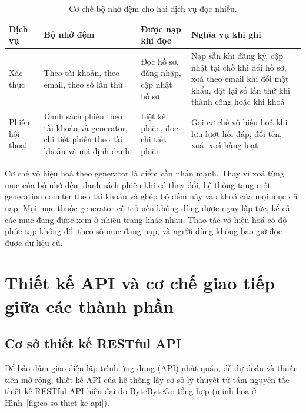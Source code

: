 \begin{table}[htbp]
    \centering
    \caption{Cơ chế bộ nhớ đệm cho hai dịch vụ đọc nhiều.}
    \label{tab:co-che-bo-nho-dem}
    \small
    \begin{tabularx}{\textwidth}{@{}>{\raggedright\arraybackslash}p{2.2cm}>{\raggedright\arraybackslash}p{3.6cm}>{\raggedright\arraybackslash}p{3.6cm}>{\raggedright\arraybackslash}X@{}}
        \toprule
        \textbf{Dịch vụ} & \textbf{Bộ nhớ đệm} & \textbf{Được nạp khi đọc} & \textbf{Nghĩa vụ khi ghi} \\
        \midrule
        Xác thực & Theo tài khoản, theo email, theo số lần thử & Đọc hồ sơ, đăng nhập, cập nhật hồ sơ & Nạp sẵn khi đăng ký, cập nhật tại chỗ khi đổi hồ sơ, xoá theo email khi đổi mật khẩu, đặt lại số lần thử khi thành công hoặc khi khoá \\
        Phiên hội thoại & Danh sách phiên theo tài khoản và generator, chi tiết phiên theo tài khoản và mã định danh & Liệt kê phiên, đọc chi tiết phiên & Gọi cơ chế vô hiệu hoá khi lưu lượt hỏi đáp, đổi tên, xoá, xoá hàng loạt \\
        \bottomrule
    \end{tabularx}
\end{table}

Cơ chế vô hiệu hoá theo generator là điểm cần nhấn mạnh. Thay vì xoá từng mục của bộ nhớ đệm danh sách phiên khi có thay đổi, hệ thống tăng một generation counter theo tài khoản và ghép bộ đếm này vào khoá của mọi mục đã nạp. Mọi mục thuộc generator cũ trở nên không dùng được ngay lập tức, kể cả các mục đang được xem ở nhiều trang khác nhau. Thao tác vô hiệu hoá có độ phức tạp không đổi theo số mục đang nạp, và người dùng không bao giờ đọc được dữ liệu cũ.

\section{Thiết kế API và cơ chế giao tiếp giữa các thành phần}
\label{sec:thiet-ke-api}

\subsection{Cơ sở thiết kế RESTful API}
\label{subsec:co-so-thiet-ke-api}

Để bảo đảm giao diện lập trình ứng dụng (API) nhất quán, dễ dự đoán và thuận tiện mở rộng, thiết kế API của hệ thống lấy cơ sở lý thuyết từ tám nguyên tắc thiết kế RESTful API hiện đại do ByteByteGo tổng hợp (minh hoạ ở Hình~\ref{fig:co-so-thiet-ke-api}).

